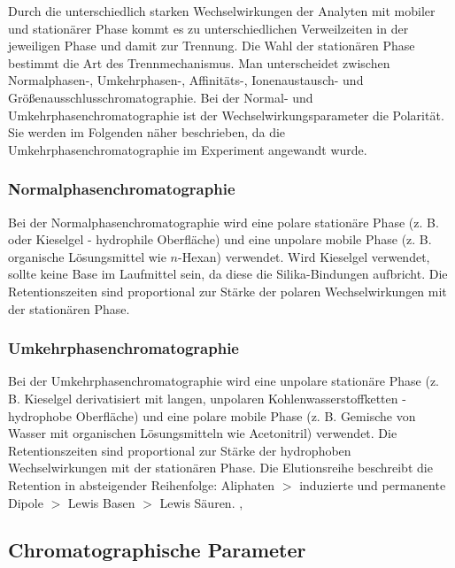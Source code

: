     Durch die unterschiedlich starken Wechselwirkungen der Analyten mit mobiler und stationärer Phase kommt es zu unterschiedlichen Verweilzeiten in der jeweiligen Phase und damit zur Trennung. Die Wahl der stationären Phase bestimmt die Art des Trennmechanismus. Man unterscheidet zwischen Normalphasen-, Umkehrphasen-, Affinitäts-, Ionenaustausch- und Größenausschlusschromatographie. Bei der Normal- und Umkehrphasenchromatographie ist der Wechselwirkungsparameter die Polarität. Sie werden im Folgenden näher beschrieben, da die Umkehrphasenchromatographie im Experiment angewandt wurde. 
    
      \subsubsection{Normalphasenchromatographie}
      
        Bei der Normalphasenchromatographie wird eine polare stationäre Phase (z. B.  oder Kieselgel - hydrophile Oberfläche) und eine unpolare mobile Phase (z. B. organische Lösungsmittel wie $n$-Hexan) verwendet. Wird Kieselgel verwendet, sollte keine Base im Laufmittel sein, da diese die Silika-Bindungen aufbricht. Die Retentionszeiten sind proportional zur Stärke der polaren Wechselwirkungen mit der stationären Phase. \citep{SkriptHPLC}
        
      \subsubsection{Umkehrphasenchromatographie}
        
        Bei der Umkehrphasenchromatographie wird eine unpolare stationäre Phase (z. B. Kieselgel derivatisiert mit langen, unpolaren Kohlenwasserstoffketten - hydrophobe Oberfläche) und eine polare mobile Phase (z. B. Gemische von Wasser mit organischen Lösungsmitteln wie Acetonitril) verwendet. Die Retentionszeiten sind proportional zur Stärke der hydrophoben Wechselwirkungen mit der stationären Phase. Die Elutionsreihe beschreibt die Retention in absteigender Reihenfolge: Aliphaten $>$ induzierte und permanente Dipole $>$ Lewis Basen $>$ Lewis Säuren. \citep{Versuchsvorschrift}, \citep[S. 162]{Taschenatlas}
    
  \subsection{Chromatographische Parameter} \label{sec:ChromatographischeParameter}
    
